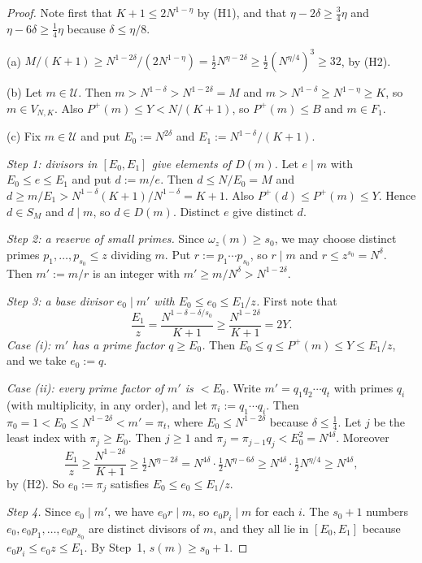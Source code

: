 \documentclass[11pt]{amsart}
\theoremstyle{definition}
\newcommand{\cU}{\mathcal{U}}
\newcommand{\Pp}{P^{+}}
\begin{document}
\begin{proof}
Note first that $K+1\le 2N^{1-\eta}$ by (H1), and that $\eta-2\delta\ge\frac34\eta$ and $\eta-6\delta\ge\frac14\eta$ because $\delta\le\eta/8$.

(a) $M/(K+1)\ge N^{1-2\delta}/(2N^{1-\eta})=\frac12N^{\eta-2\delta}\ge\frac12(N^{\eta/4})^3\ge32$, by (H2).

(b) Let $m\in\cU$. Then $m>N^{1-\delta}>N^{1-2\delta}=M$ and $m>N^{1-\delta}\ge N^{1-\eta}\ge K$, so $m\in V_{N,K}$. Also $\Pp(m)\le Y<N/(K+1)$, so $\Pp(m)\le B$ and $m\in F_1$.

(c) Fix $m\in\cU$ and put $E_0:=N^{2\delta}$ and $E_1:=N^{1-\delta}/(K+1)$.

\emph{Step 1: divisors in $[E_0,E_1]$ give elements of $D(m)$.} Let $e\mid m$ with $E_0\le e\le E_1$ and put $d:=m/e$. Then $d\le N/E_0=M$ and $d\ge m/E_1>N^{1-\delta}(K+1)/N^{1-\delta}=K+1$. Also $\Pp(d)\le\Pp(m)\le Y$. Hence $d\in S_M$ and $d\mid m$, so $d\in D(m)$. Distinct $e$ give distinct $d$.

\emph{Step 2: a reserve of small primes.} Since $\omega_z(m)\ge s_0$, we may choose distinct primes $p_1,\dots,p_{s_0}\le z$ dividing $m$. Put $r:=p_1\cdots p_{s_0}$, so $r\mid m$ and $r\le z^{s_0}=N^{\delta}$. Then $m':=m/r$ is an integer with $m'\ge m/N^\delta>N^{1-2\delta}$.

\emph{Step 3: a base divisor $e_0\mid m'$ with $E_0\le e_0\le E_1/z$.} First note that
\[
\frac{E_1}{z}=\frac{N^{1-\delta-\delta/s_0}}{K+1}\ge\frac{N^{1-2\delta}}{K+1}=2Y .
\]
\emph{Case (i): $m'$ has a prime factor $q\ge E_0$.} Then $E_0\le q\le\Pp(m)\le Y\le E_1/z$, and we take $e_0:=q$.

\emph{Case (ii): every prime factor of $m'$ is $<E_0$.} Write $m'=q_1q_2\cdots q_t$ with primes $q_i$ (with multiplicity, in any order), and let $\pi_i:=q_1\cdots q_i$. Then $\pi_0=1<E_0\le N^{1-2\delta}<m'=\pi_t$, where $E_0\le N^{1-2\delta}$ because $\delta\le\frac14$. Let $j$ be the least index with $\pi_j\ge E_0$. Then $j\ge1$ and $\pi_j=\pi_{j-1}q_j<E_0^2=N^{4\delta}$. Moreover
\[
\frac{E_1}{z}\ge\frac{N^{1-2\delta}}{K+1}\ge\tfrac12N^{\eta-2\delta}=N^{4\delta}\cdot\tfrac12N^{\eta-6\delta}\ge N^{4\delta}\cdot\tfrac12N^{\eta/4}\ge N^{4\delta},
\]
by (H2). So $e_0:=\pi_j$ satisfies $E_0\le e_0\le E_1/z$.

\emph{Step 4.} Since $e_0\mid m'$, we have $e_0r\mid m$, so $e_0p_i\mid m$ for each $i$. The $s_0+1$ numbers $e_0,e_0p_1,\dots,e_0p_{s_0}$ are distinct divisors of $m$, and they all lie in $[E_0,E_1]$ because $e_0p_i\le e_0z\le E_1$. By Step~1, $s(m)\ge s_0+1$.


\end{proof}
\end{document}
